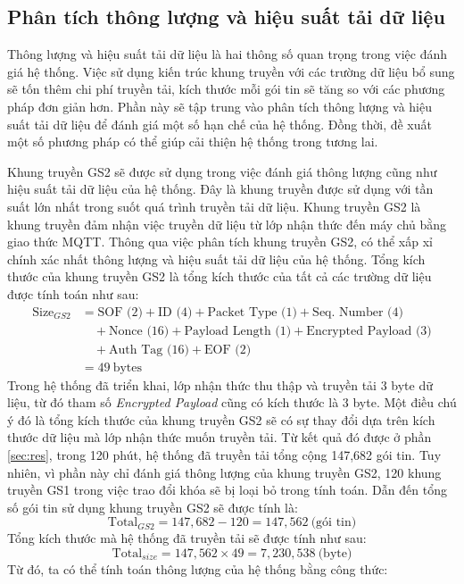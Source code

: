 \subsection{Phân tích thông lượng và hiệu suất tải dữ liệu}
Thông lượng và hiệu suất tải dữ liệu là hai thông số quan trọng trong việc đánh giá hệ thống. Việc sử dụng kiến trúc khung truyền với các trường dữ liệu bổ sung sẽ tốn thêm chi phí truyền tải, kích thước mỗi gói tin sẽ tăng so với các phương pháp đơn giản hơn. Phần này sẽ tập trung vào phân tích thông lượng và hiệu suất tải dữ liệu để đánh giá một số hạn chế của hệ thống. Đồng thời, đề xuất một số phương pháp có thể giúp cải thiện hệ thống trong tương lai.

Khung truyền GS2 sẽ được sử dụng trong việc đánh giá thông lượng cũng như hiệu suất tải dữ liệu của hệ thống. Đây là khung truyền được sử dụng với tần suất lớn nhất trong suốt quá trình truyền tải dữ liệu. Khung truyền GS2 là khung truyền đảm nhận việc truyền dữ liệu từ lớp nhận thức đến máy chủ bằng giao thức MQTT. Thông qua việc phân tích khung truyền GS2, có thể xấp xỉ chính xác nhất thông lượng và hiệu suất tải dữ liệu của hệ thống. Tổng kích thước của khung truyền GS2 là tổng kích thước của tất cả các trường dữ liệu được tính toán như sau:
\begin{align*}
\text{Size}_{GS2} &= \text{SOF (2)} + \text{ID (4)} + \text{Packet Type (1)} + \text{Seq. Number (4)} \\
& \quad + \text{Nonce (16)} + \text{Payload Length (1)} + \text{Encrypted Payload (3)} \\
& \quad + \text{Auth Tag (16)} + \text{EOF (2)} \\
&= 49\ \text{bytes}
\end{align*}
Trong hệ thống đã triển khai, lớp nhận thức thu thập và truyền tải 3 byte dữ liệu, từ đó tham số \textit{Encrypted Payload} cũng có kích thước là 3 byte. Một điều chú ý đó là tổng kích thước của khung truyền GS2 sẽ có sự thay đổi dựa trên kích thước dữ liệu mà lớp nhận thức muốn truyền tải. Từ kết quả đó được ở phần \ref{sec:res}, trong 120 phút, hệ thống đã truyền tải tổng cộng 147,682 gói tin. Tuy nhiên, vì phần này chỉ đánh giá thông lượng của khung truyền GS2, 120 khung truyền GS1 trong việc trao đổi khóa sẽ bị loại bỏ trong tính toán. Dẫn đến tổng số gói tin sử dụng khung truyền GS2 sẽ được tính là:
\[
\text{Total}_{GS2} = 147,682 - 120 = 147,562 \ \text{(gói tin)}
\]
Tổng kích thước mà hệ thống đã truyền tải sẽ được tính như sau:
\[
\text{Total}_{size} = 147,562 \times 49 = 7,230,538 \ \text{(byte)}
\]
Từ đó, ta có thể tính toán thông lượng của hệ thống bằng công thức:
